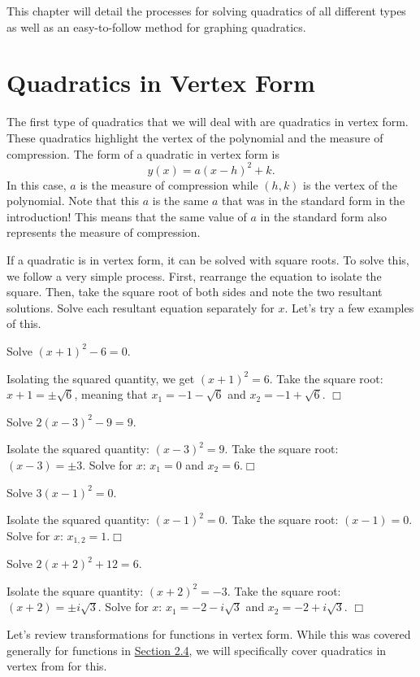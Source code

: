 \documentclass[../book.tex]{subfiles}
\begin{document}
This chapter will detail the processes for solving quadratics of all different types as well as an easy-to-follow method for graphing quadratics.
\section{Quadratics in Vertex Form}
\noindent The first type of quadratics that we will deal with are quadratics in vertex form.  These quadratics highlight the vertex of the polynomial and the measure of compression.  The form of a quadratic in vertex form is $$y(x)=a(x-h)^2+k.$$  In this case, $a$ is the measure of compression while $(h,k)$ is the vertex of the polynomial.  Note that this $a$ is the same $a$ that was in the standard form in the introduction!  This means that the same value of $a$ in the standard form also represents the measure of compression.

If a quadratic is in vertex form, it can be solved with square roots.  To solve this, we follow a very simple process.  First, rearrange the equation to isolate the square.  Then, take the square root of both sides and note the two resultant solutions.  Solve each resultant equation separately for $x$.  Let's try a few examples of this.
\begin{example}
Solve $(x+1)^2-6=0$.
\end{example}
\begin{solution}
Isolating the squared quantity, we get $(x+1)^2=6$.  Take the square root: $x+1=\pm\sqrt{6}$, meaning that $x_1=-1-\sqrt{6}$ and $x_2=-1+\sqrt{6}$.  $\Box$
\end{solution}
\begin{example}
Solve $2(x-3)^2-9=9$.
\end{example}
\begin{solution}
Isolate the squared quantity: $(x-3)^2=9$.  Take the square root: $(x-3)=\pm 3$.  Solve for $x$: $x_1=0$ and $x_2=6$.$\Box$
\end{solution}
\begin{example}
Solve $3(x-1)^2=0$.
\end{example}
\begin{solution}
Isolate the squared quantity: $(x-1)^2=0$.  Take the square root: $(x-1)=0$.  Solve for $x$: $x_{1,2}=1$.$\Box$
\end{solution}
\begin{example}
Solve $2(x+2)^2+12=6$.
\end{example}
\begin{solution}
Isolate the square quantity: $(x+2)^2=-3$.  Take the square root: $(x+2)=\pm i\sqrt{3}$.  Solve for $x$: $x_1=-2-i\sqrt{3}$ and $x_2=-2+i\sqrt{3}$.  $\Box$
\end{solution}
Let's review transformations for functions in vertex form.  While this was covered generally for functions in \hyperlink{section.2.4}{Section 2.4}, we will specifically cover quadratics in vertex from for this.
\end{document}
